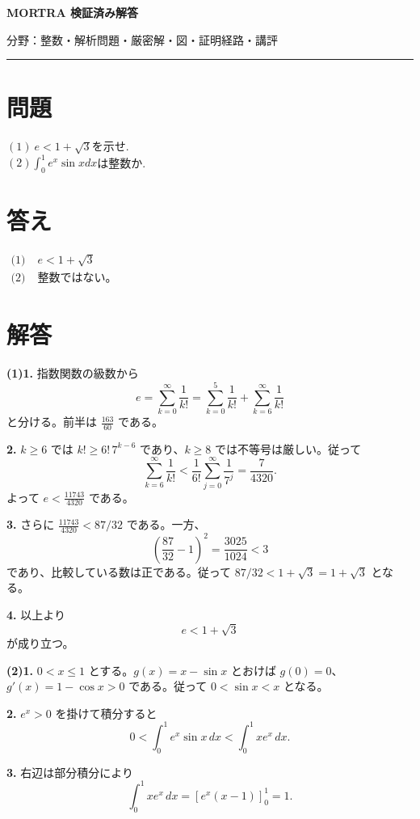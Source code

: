 \documentclass[uplatex,dvipdfmx,11pt]{jsarticle}
\begin{document}
\begin{center}
{\LARGE\bfseries MORTRA 検証済み解答\par}
\vspace{1mm}
{\small 分野：整数・解析\qquad 問題・厳密解・図・証明経路・講評}
\end{center}
\vspace{1mm}
\hrule
\vspace{5mm}

\section*{問題}
$(1)\ e<1+\sqrt3$を示せ.\\
$(2) \displaystyle\int_{0}^{1}e^x \sin xdx$は整数か.

\section*{答え}
\(\begin{aligned}\text{(1)}\;&e<1 + \sqrt{3}\\\text{(2)}\;&\text{整数ではない。}\end{aligned}\)

\section*{解答}
\textbf{(1)}\quad \textbf{1.} 指数関数の級数から \[e=\sum_{k=0}^\infty\frac1{k!}=\sum_{k=0}^5\frac1{k!}+\sum_{k=6}^\infty\frac1{k!}\] と分ける。前半は \(\frac{163}{60}\) である。

\textbf{2.} \(k\ge6\) では \(k!\ge6!\,7^{k-6}\) であり、\(k\ge8\) では不等号は厳しい。従って \[\sum_{k=6}^\infty\frac1{k!}<\frac1{6!}\sum_{j=0}^\infty\frac1{7^j}=\frac{7}{4320}.\] よって \(e<\frac{11743}{4320}\) である。

\textbf{3.} さらに \(\frac{11743}{4320}<87/32\) である。一方、\[\left(\frac{87}{32}-1\right)^2=\frac{3025}{1024}<3\] であり、比較している数は正である。従って \(87/32<1+\sqrt{3}=1 + \sqrt{3}\) となる。

\textbf{4.} 以上より \[e<1 + \sqrt{3}\] が成り立つ。

\textbf{(2)}\quad \textbf{1.} \(0<x\le1\) とする。\(g(x)=x-\sin x\) とおけば \(g(0)=0\)、\(g'(x)=1-\cos x>0\) である。従って \(0<\sin x<x\) となる。

\textbf{2.} \(e^{x}>0\) を掛けて積分すると \[0<\int_0^1e^{x}\sin x\,dx<\int_0^1xe^{x}\,dx.\]

\textbf{3.} 右辺は部分積分により \[\int_0^1xe^{x}\,dx=\left[e^{x}(x-1)\right]_0^1=1.\]
\end{document}
